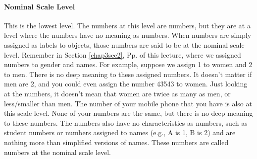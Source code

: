 \documentclass{ltjsbook}
\begin{document}
\paragraph{Nominal Scale Level}
This is the lowest level. The numbers at this level are numbers, but they are at a level where the numbers have no meaning as numbers. When numbers are simply assigned as labels to objects, those numbers are said to be at the nominal scale level. Remember in Section \ref{chap3sec2}, Pp.\pageref{chap3sec2} of this lecture, where we assigned numbers to gender and names. For example, suppose we assign 1 to women and 2 to men. There is no deep meaning to these assigned numbers. It doesn't matter if men are 2, and you could even assign the number 43543 to women. Just looking at the numbers, it doesn't mean that women are twice as many as men, or less/smaller than men. The number of your mobile phone that you have is also at this scale level. None of your numbers are the same, but there is no deep meaning to these numbers. The numbers also have no characteristics as numbers, such as student numbers or numbers assigned to names (e.g., A is 1, B is 2) and are nothing more than simplified versions of names. These numbers are called numbers at the nominal scale level.
\end{document}

